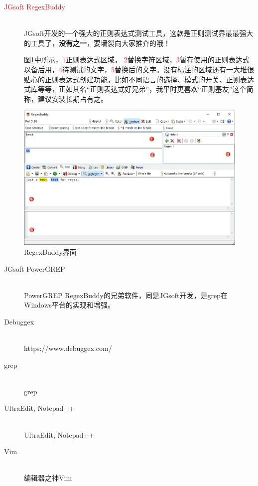 \documentclass[12pt,a4paper,twoside]{ctexart}
\begin{document}
\begin{description}
\item[\textcolor{red}{JGsoft RegexBuddy}] \hfill \\
  JGsoft开发的一个强大的正则表达式测试工具，这款是正则测试界最最强大的工具了，\textbf{没有之一}，要墙裂向大家推介的哦！\Smiley \par
  图\ref{fig:regexbuddy}中所示，\textcolor{red}{\textcircled{\footnotesize{1}}}正则表达式区域， \textcolor{red}{\textcircled{\footnotesize{2}}}替换字符区域，\textcolor{red}{\textcircled{\footnotesize{3}}}暂存使用的正则表达式以备后用，\textcolor{red}{\textcircled{\footnotesize{4}}}待测试的文字，\textcolor{red}{\textcircled{\footnotesize{5}}}替换后的文字。没有标注的区域还有一大堆很贴心的正则表达式创建功能，比如不同语言的选择、模式的开关、正则表达式库等等，正如其名“正则表达式好兄弟”，我平时更喜欢“正则基友”这个简称，\Smiley 建议安装长期占有之。 \par
\end{description}
\begin{figure}[htbp]
  \centering
  \includegraphics[width=18cm]{FIG/regexbuddy.png}
  \caption{RegexBuddy界面}
  \label{fig:regexbuddy}
\end{figure}

\begin{description}
\item[JGsoft PowerGREP] \hfill \\
  PowerGREP RegexBuddy的兄弟软件，同是JGsoft开发，是grep在Windows平台的实现和增强。
\item[Debuggex] \hfill \\
  https://www.debuggex.com/
\item[grep] \hfill \\
  grep
\item[UltraEdit, Notepad++] \hfill \\
  UltraEdit, Notepad++
\item[Vim] \hfill \\
  编辑器之神Vim
\end{description}
\end{document}
